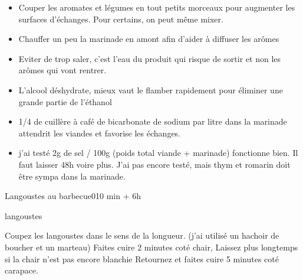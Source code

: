 {\renewcommand{\section}[1]{}

\section{Optimiser une marinade}
\begin{itemize}
\item Couper les aromates et légumes en tout petits morceaux pour augmenter les surfaces d'échanges. Pour certains, on peut même mixer. 
\item Chauffer un peu la marinade en amont afin d'aider à diffuser les arômes
\item Eviter de trop saler, c'est l'eau du produit qui risque de sortir et non les arômes qui vont rentrer. 
\item L'alcool déshydrate, mieux vaut le flamber rapidement pour éliminer une grande partie de l'éthanol
\item 1/4 de cuillère à café  de bicarbonate de sodium par litre dans la marinade attendrit les viandes et favorise les échanges. 
\item j'ai testé 2g de sel / 100g (poids total viande + marinade) fonctionne bien. Il faut laisser 48h voire plus. J'ai pas encore testé, mais thym et romarin doit être sympa dans la marinade. 
\end{itemize}

\section{Langoustes au barbecue}
\begin{recette}{Langoustes au barbecue}{0}{10 min + 6h}{}
\begin{ingredients}
\ingredient langoustes
\end{ingredients}

\begin{preparation}
\etape Coupez les langoustes dans le sens de la longueur. (j'ai utilisé un hachoir de boucher et un marteau)
\etape Faites cuire 2 minutes coté chair, Laissez plus longtemps si la chair n'est pas encore blanchie
\etape Retournez et faites cuire 5 minutes coté carapace.
\end{preparation}
\end{recette}

}
